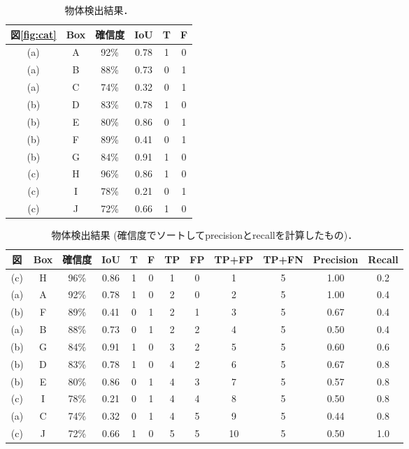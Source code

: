 \documentclass[twocolumn]{jsarticle} %
\begin{document}
\begin{table}
    \caption{物体検出結果．}
    \label{tbl:detect_cat}
    \centering
    \footnotesize
    \begin{tabular}{cccccc} 
        \toprule
        図\ref{fig:cat} & Box & 確信度 & IoU & T & F \\ 
        \midrule
        (a) & A & 92\% & 0.78 & 1 & 0 \\ 
        (a) & B & 88\% & 0.73 & 0 & 1 \\ 
        (a) & C & 74\% & 0.32 & 0 & 1 \\ 
        (b) & D & 83\% & 0.78 & 1 & 0 \\ 
        (b) & E & 80\% & 0.86 & 0 & 1 \\ 
        (b) & F & 89\% & 0.41 & 0 & 1 \\ 
        (b) & G & 84\% & 0.91 & 1 & 0 \\ 
        (c) & H & 96\% & 0.86 & 1 & 0 \\ 
        (c) & I & 78\% & 0.21 & 0 & 1 \\ 
        (c) & J & 72\% & 0.66 & 1 & 0 \\ 
        \bottomrule
    \end{tabular}
\end{table}%
\begin{table}
    \caption{物体検出結果 (確信度でソートしてprecisionとrecallを計算したもの)．}
    \label{tbl:detect_cat_PR}
    \centering
    \setlength{\tabcolsep}{1pt}
    \footnotesize
    \begin{tabular}{cccccccccccc} 
        \toprule
        図 & Box & 確信度 & IoU & T & F & TP & FP & TP+FP & TP+FN & Precision & Recall \\ 
        \midrule
        (c) & H & 96\% & 0.86 & 1 & 0 & 1 & 0 & 1 & 5 & 1.00 & 0.2 \\ 
        (a) & A & 92\% & 0.78 & 1 & 0 & 2 & 0 & 2 & 5 & 1.00 & 0.4 \\ 
        (b) & F & 89\% & 0.41 & 0 & 1 & 2 & 1 & 3 & 5 & 0.67 & 0.4 \\ 
        (a) & B & 88\% & 0.73 & 0 & 1 & 2 & 2 & 4 & 5 & 0.50 & 0.4 \\ 
        (b) & G & 84\% & 0.91 & 1 & 0 & 3 & 2 & 5 & 5 & 0.60 & 0.6 \\ 
        (b) & D & 83\% & 0.78 & 1 & 0 & 4 & 2 & 6 & 5 & 0.67 & 0.8 \\ 
        (b) & E & 80\% & 0.86 & 0 & 1 & 4 & 3 & 7 & 5 & 0.57 & 0.8 \\ 
        (c) & I & 78\% & 0.21 & 0 & 1 & 4 & 4 & 8 & 5 & 0.50 & 0.8 \\ 
        (a) & C & 74\% & 0.32 & 0 & 1 & 4 & 5 & 9 & 5 & 0.44 & 0.8 \\ 
        (c) & J & 72\% & 0.66 & 1 & 0 & 5 & 5 & 10 & 5 & 0.50 & 1.0 \\ 
        \bottomrule
    \end{tabular}
\end{table}%
\end{document}
